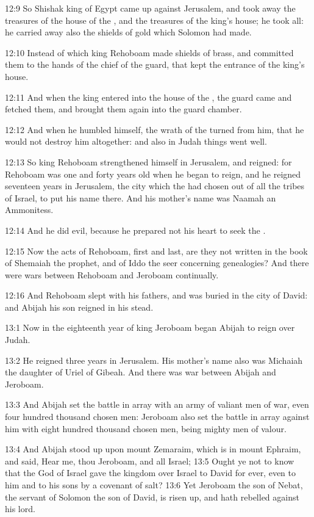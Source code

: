 12:9 So Shishak king of Egypt came up against Jerusalem, and took away the treasures of the house of the \LORD, and the treasures of the king's house; he took all: he carried away also the shields of gold which Solomon had made.

12:10 Instead of which king Rehoboam made shields of brass, and committed them to the hands of the chief of the guard, that kept the entrance of the king's house.

12:11 And when the king entered into the house of the \LORD, the guard came and fetched them, and brought them again into the guard chamber.

12:12 And when he humbled himself, the wrath of the \LORD turned from him, that he would not destroy him altogether: and also in Judah things went well.

12:13 So king Rehoboam strengthened himself in Jerusalem, and reigned: for Rehoboam was one and forty years old when he began to reign, and he reigned seventeen years in Jerusalem, the city which the \LORD had chosen out of all the tribes of Israel, to put his name there. And his mother's name was Naamah an Ammonitess.

12:14 And he did evil, because he prepared not his heart to seek the \LORD.

12:15 Now the acts of Rehoboam, first and last, are they not written in the book of Shemaiah the prophet, and of Iddo the seer concerning genealogies? And there were wars between Rehoboam and Jeroboam continually.

12:16 And Rehoboam slept with his fathers, and was buried in the city of David: and Abijah his son reigned in his stead.

13:1 Now in the eighteenth year of king Jeroboam began Abijah to reign over Judah.

13:2 He reigned three years in Jerusalem. His mother's name also was Michaiah the daughter of Uriel of Gibeah. And there was war between Abijah and Jeroboam.

13:3 And Abijah set the battle in array with an army of valiant men of war, even four hundred thousand chosen men: Jeroboam also set the battle in array against him with eight hundred thousand chosen men, being mighty men of valour.

13:4 And Abijah stood up upon mount Zemaraim, which is in mount Ephraim, and said, Hear me, thou Jeroboam, and all Israel; 13:5 Ought ye not to know that the \LORD God of Israel gave the kingdom over Israel to David for ever, even to him and to his sons by a covenant of salt?  13:6 Yet Jeroboam the son of Nebat, the servant of Solomon the son of David, is risen up, and hath rebelled against his lord.

